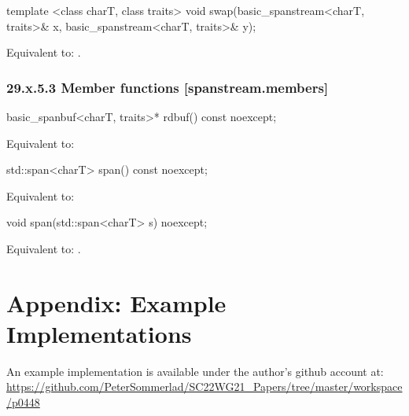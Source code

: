 \documentclass[ebook,11pt,article]{memoir}
\begin{document}
\begin{itemdecl}
template <class charT, class traits>
  void swap(basic_spanstream<charT, traits>& x,
            basic_spanstream<charT, traits>& y);
\end{itemdecl}

\begin{itemdescr}
\pnum
\effects Equivalent to: .
\end{itemdescr}

\subsection{29.x.5.3 Member functions [spanstream.members]}
\label{spanstream.members}

\begin{itemdecl}
basic_spanbuf<charT, traits>* rdbuf() const noexcept;
\end{itemdecl}

\begin{itemdescr}
\pnum
\effects Equivalent to: \\
\end{itemdescr}

\begin{itemdecl}
std::span<charT> span() const noexcept;
\end{itemdecl}

\begin{itemdescr}
\pnum
\effects Equivalent to: \\
\end{itemdescr}

\begin{itemdecl}
void span(std::span<charT> s) noexcept;
\end{itemdecl}

\begin{itemdescr}
\pnum
\effects
Equivalent to:
.
\end{itemdescr}



\chapter{Appendix: Example Implementations}
An example implementation is available under the author's github account at:
\url{https://github.com/PeterSommerlad/SC22WG21_Papers/tree/master/workspace/p0448}
\end{document}
